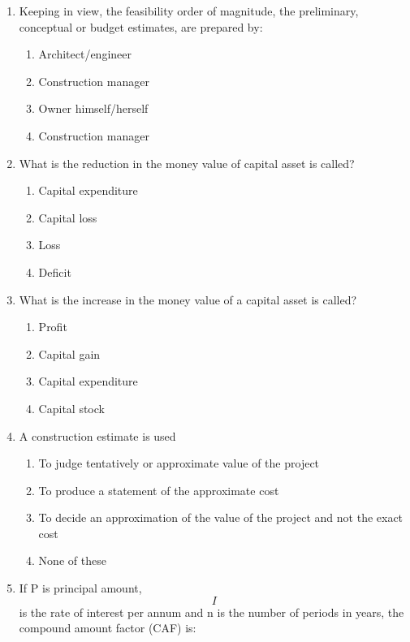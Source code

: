 \documentclass[11pt,a4paper]{article}
\begin{document}
\begin{enumerate}
\begin{enumerate*}[itemjoin=\qquad, label=\Alph*.]
\end{enumerate*}
\item{Keeping in view, the feasibility order of magnitude, the preliminary, conceptual or budget estimates, are prepared by:}
\begin{enumerate}[label=\Alph*.]
\item{Architect/engineer}
\item{Construction manager}
\item{Owner himself/herself}
\item{Construction manager}
\end{enumerate}
\item{What is the reduction in the money value of capital asset is called?}
\begin{enumerate}[label=\Alph*.]
\item{Capital expenditure}
\item{Capital loss}
\item{Loss}
\item{Deficit}
\end{enumerate}
\item{What is the increase in the money value of a capital asset is called?}
\begin{enumerate}[label=\Alph*.]
\item{Profit}
\item{Capital gain}
\item{Capital expenditure}
\item{Capital stock}
\end{enumerate}
\item{A construction estimate is used}
\begin{enumerate}[label=\Alph*.]
\item{To judge tentatively or approximate value of the project}
\item{To produce a statement of the approximate cost}
\item{To decide an approximation of the value of the project and not the exact cost}
\item{None of these}
\end{enumerate}
\item{If P is principal amount, $$I$$ is the rate of interest per annum and n is the number of periods in years, the compound amount factor (CAF) is:
}
\\
\end{enumerate}
\end{document}
